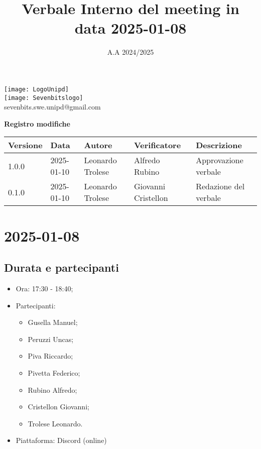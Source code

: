 \documentclass[10pt]{article}
\title{Verbale Interno del meeting in data 2025-01-08}
\date{A.A 2024/2025}
\begin{document}
\maketitle
\begin{center}
\texttt{[image: LogoUnipd]}\\
\texttt{[image: Sevenbitslogo]}\\
sevenbits.swe.unipd@gmail.com\\
\vspace{2mm}

\textbf{Registro modifiche}\\
\vspace{2mm}
\begin{tabularx}{\textwidth}{|l|l|l|l|X|}
\hline
\textbf{Versione} & \textbf{Data} & \textbf{Autore} & \textbf{Verificatore} & \textbf{Descrizione} \\
\hline
1.0.0 & 2025-01-10 & Leonardo Trolese & Alfredo Rubino & Approvazione verbale \\
\hline
0.1.0 & 2025-01-10 & Leonardo Trolese & Giovanni Cristellon & Redazione del verbale \\
\hline
\end{tabularx}
\end{center}

\newpage
\tableofcontents
\newpage
\section{2025-01-08}
\subsection{Durata e partecipanti}
\begin{itemize}
\item Ora: 17:30 - 18:40;
\item Partecipanti: 	
	\begin{itemize}
		\item Gusella Manuel;
		\item Peruzzi Uncas;
		\item Piva Riccardo;
		\item Pivetta Federico;
		\item Rubino Alfredo;
		\item Cristellon Giovanni;
		\item Trolese Leonardo.
	\end{itemize}
\item Piattaforma: Discord (online)
\end{itemize}
\end{document}
